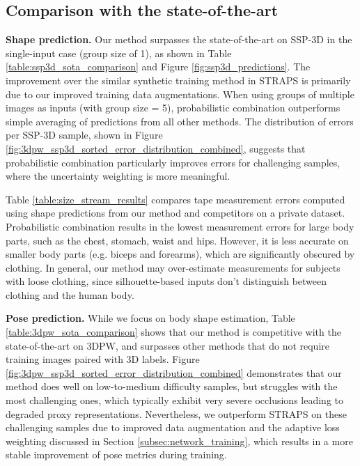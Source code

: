 \documentclass[final]{cvpr}
\begin{document}
\subsection{Comparison with the state-of-the-art}

\noindent \textbf{Shape prediction.} Our method surpasses the state-of-the-art on SSP-3D in the single-input case (group size of 1), as shown in Table \ref{table:ssp3d_sota_comparison} and Figure \ref{fig:ssp3d_predictions}. The improvement over the similar synthetic training method in STRAPS \cite{STRAPS2020BMVC} is primarily due to our improved training data augmentations. When using groups of multiple images as inputs (with group size = 5), probabilistic combination outperforms simple averaging of predictions from all other methods. The distribution of errors per SSP-3D sample, shown in Figure \ref{fig:3dpw_ssp3d_sorted_error_distribution_combined}, suggests that probabilistic combination particularly improves errors for challenging samples, where the uncertainty weighting is more meaningful.

Table \ref{table:size_stream_results} compares tape measurement errors computed using shape predictions from our method and competitors on a private dataset. Probabilistic combination results in the lowest measurement errors for large body parts, such as the chest, stomach, waist and hips. However, it is less accurate on smaller body parts (e.g. biceps and forearms), which are significantly obscured by clothing. In general, our method may over-estimate measurements for subjects with loose clothing, since silhouette-based inputs don't distinguish between clothing and the human body.

\noindent \textbf{Pose prediction.} While we focus on body shape estimation, Table \ref{table:3dpw_sota_comparison} shows that our method is competitive with the state-of-the-art on 3DPW, and surpasses other methods that do not require training images paired with 3D labels. Figure \ref{fig:3dpw_ssp3d_sorted_error_distribution_combined} demonstrates that our method does well on low-to-medium difficulty samples, but struggles with the most challenging ones, which typically exhibit very severe occlusions leading to degraded proxy representations. Nevertheless, we outperform STRAPS \cite{STRAPS2020BMVC} on these challenging samples due to improved data augmentation and the adaptive loss weighting discussed in Section \ref{subsec:network_training}, which results in a more stable improvement of pose metrics during training.
\end{document}
